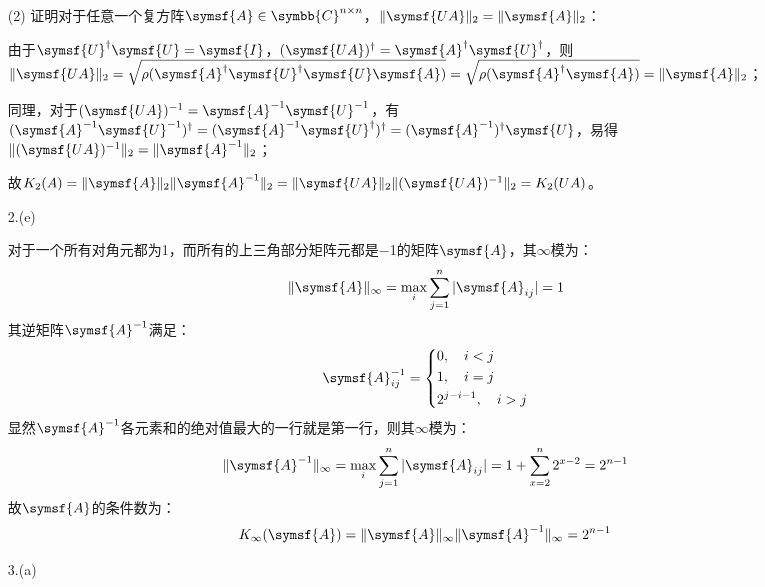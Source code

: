 \documentclass[a4paper]{article}
\renewcommand\mathsf{\symsf}
\begin{document}
\begin{enumerate}
(2) 证明对于任意一个复方阵$\mathsf{A}\in\symbb{C}^{n\times n}$，$\|\mathsf{UA}\|_2=\|\mathsf{A}\|_2$：

由于$\mathsf{U}^\dagger\mathsf{U}=\mathsf{I}$，$(\mathsf{UA})^\dagger=\mathsf{A}^\dagger\mathsf{U}^\dagger$，则$\|\mathsf{UA}\|_2=\sqrt{\rho(\mathsf{A}^\dagger\mathsf{U}^\dagger\mathsf{U}\mathsf{A})}=\sqrt{\rho(\mathsf{A}^\dagger\mathsf{A})}=\|\mathsf{A}\|_2$；

同理，对于$(\mathsf{UA})^{-1}=\mathsf{A}^{-1}\mathsf{U}^{-1}$，有$(\mathsf{A}^{-1}\mathsf{U}^{-1})^\dagger=(\mathsf{A}^{-1}\mathsf{U}^\dagger)^\dagger=(\mathsf{A}^{-1})^\dagger\mathsf{U}$，易得$\|(\mathsf{UA})^{-1}\|_2=\|\mathsf{A}^{-1}\|_2$；

故$K_2(A)=\|\mathsf{A}\|_2\|\mathsf{A}^{-1}\|_2=\|\mathsf{UA}\|_2\|(\mathsf{UA})^{-1}\|_2=K_2(UA)$。

\item[2.(e)]

对于一个所有对角元都为1，而所有的上三角部分矩阵元都是−1的矩阵$\mathsf{A}$，其$\infty$模为：
\[
    \|\mathsf{A}\|_\infty = \max\limits_i\sum\limits_{j=1}^n |\mathsf{A}_{ij}| = 1
\]
其逆矩阵$\mathsf{A}^{-1}$满足：
\[
    \mathsf{A}^{-1}_{ij} = \left\{
        \begin{aligned}
            &0,\quad i<j \\
            &1,\quad i=j \\
            &2^{j-i-1},\quad i>j \\
        \end{aligned}
    \right.
\]
显然$\mathsf{A}^{-1}$各元素和的绝对值最大的一行就是第一行，则其$\infty$模为：
\[
    \|\mathsf{A}^{-1}\|_\infty = \max\limits_i\sum\limits_{j=1}^n |\mathsf{A}_{ij}| = 1 + \sum_{x=2}^{n} 2^{x-2} = 2^{n-1}
\]
故$\mathsf{A}$的条件数为：
\[
    K_\infty(\mathsf{A}) = \|\mathsf{A}\|_\infty\|\mathsf{A}^{-1}\|_\infty = 2^{n-1}
\]

\item[3.(a)]


\end{enumerate}
\end{document}
